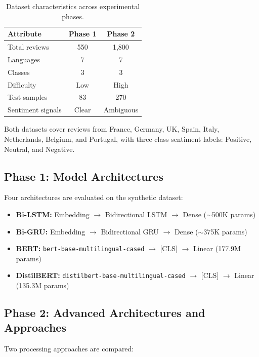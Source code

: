 \documentclass[10pt,twocolumn,a4paper]{article}
\begin{document}
\begin{table}[H]
\caption{Dataset characteristics across experimental phases.}
\label{tab:datasets}
\setlength{\tabcolsep}{10pt}
\renewcommand{\arraystretch}{1.4}
\begin{tabular}{l c c}
\toprule
\textbf{Attribute} & \textbf{Phase 1} & \textbf{Phase 2} \\
\midrule
Total reviews & 550 & 1,800 \\
Languages & 7 & 7 \\
Classes & 3 & 3 \\
Difficulty & Low & High \\
Test samples & 83 & 270 \\
Sentiment signals & Clear & Ambiguous \\
\bottomrule
\end{tabular}
\end{table}

Both datasets cover reviews from France, Germany, UK, Spain, Italy, Netherlands, Belgium, and Portugal, with three-class sentiment labels: Positive, Neutral, and Negative.

\subsection{Phase 1: Model Architectures}

Four architectures are evaluated on the synthetic dataset:
\begin{itemize}[leftmargin=*,noitemsep,topsep=2pt]
    \item \textbf{Bi-LSTM:} Embedding $\rightarrow$ Bidirectional LSTM $\rightarrow$ Dense ($\sim$500K params)
    \item \textbf{Bi-GRU:} Embedding $\rightarrow$ Bidirectional GRU $\rightarrow$ Dense ($\sim$375K params)
    \item \textbf{BERT:} \texttt{bert-base-multilingual-cased} $\rightarrow$ [CLS] $\rightarrow$ Linear (177.9M params)
    \item \textbf{DistilBERT:} \texttt{distilbert-base-multilingual-cased} $\rightarrow$ [CLS] $\rightarrow$ Linear (135.3M params)
\end{itemize}

\subsection{Phase 2: Advanced Architectures and Approaches}

Two processing approaches are compared:
\end{document}
